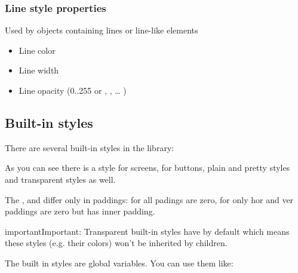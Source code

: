 \documentclass[letterpaper,10pt,english]{sphinxmanual}
\begin{document}
\subsubsection{Line style properties}
\label{\detokenize{overview/styles:line-style-properties}}
Used by objects containing lines or line-like elements
\begin{itemize}
\item {} 
 Line color

\item {} 
 Line width

\item {} 
 Line opacity (0..255 or , ,  … )

\end{itemize}


\subsection{Built-in styles}
\label{\detokenize{overview/styles:built-in-styles}}
There are several built-in styles in the library:


As you can see there is a style for screens, for buttons, plain and pretty styles and transparent styles as well.

The ,  and  differ only in paddings: for  all padings are zero, for  only hor and ver paddings are zero but has inner padding.

\begin{sphinxadmonition}{important}{Important:}
Transparent built-in styles have  by default which means these styles (e.g. their colors) won’t be inherited by children.
\end{sphinxadmonition}

The built in styles are global  variables. You can use them like:

\begin{sphinxVerbatim}[commandchars=\\\{\}]
  
\end{sphinxVerbatim}
\end{document}
